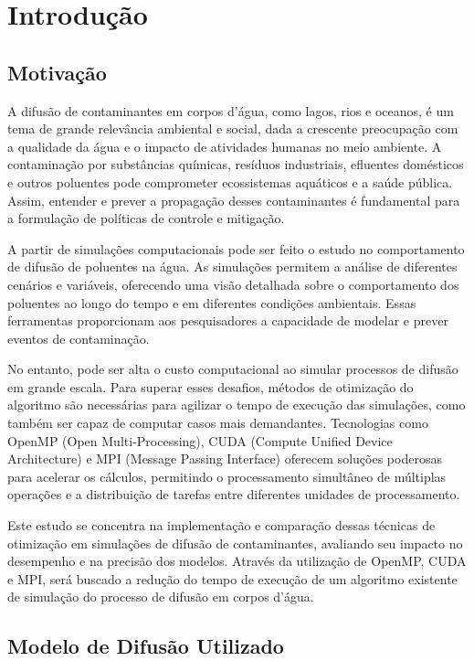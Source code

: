 \section{Introdução}

\subsection{Motivação} \label{sec:firstpage}

A difusão de contaminantes em corpos d'água, como lagos, rios e oceanos, é um tema de grande relevância ambiental e social, dada a crescente preocupação com a qualidade da água e o impacto de atividades humanas no meio ambiente. A contaminação por substâncias químicas, resíduos industriais, efluentes domésticos e outros poluentes pode comprometer ecossistemas aquáticos e a saúde pública. Assim, entender e prever a propagação desses contaminantes é fundamental para a formulação de políticas de controle e mitigação.

A partir de simulações computacionais pode ser feito o estudo no comportamento de difusão de poluentes na água. As simulações permitem a análise de diferentes cenários e variáveis, oferecendo uma visão detalhada sobre o comportamento dos poluentes ao longo do tempo e em diferentes condições ambientais. Essas ferramentas proporcionam aos pesquisadores a capacidade de modelar e prever eventos de contaminação.

No entanto, pode ser alta o custo computacional ao simular processos de difusão em grande escala. Para superar esses desafios, métodos de otimização do algoritmo são necessárias para agilizar o tempo de execução das simulações, como também ser capaz de computar casos mais demandantes. Tecnologias como OpenMP (Open Multi-Processing), CUDA (Compute Unified Device Architecture) e MPI (Message Passing Interface) oferecem soluções poderosas para acelerar os cálculos, permitindo o processamento simultâneo de múltiplas operações e a distribuição de tarefas entre diferentes unidades de processamento.

Este estudo se concentra na implementação e comparação dessas técnicas de otimização em simulações de difusão de contaminantes, avaliando seu impacto no desempenho e na precisão dos modelos. Através da utilização de OpenMP, CUDA e MPI, será buscado a redução do tempo de execução de um algoritmo existente de simulação do processo de difusão em corpos d'água.

\subsection{Modelo de Difusão Utilizado} \label{sec:firstpage}

